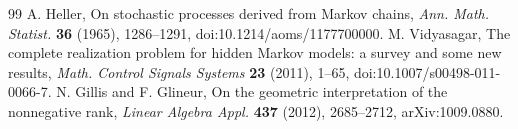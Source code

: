 \documentclass[11pt]{amsart}
\theoremstyle{definition}\newtheorem{definition}[theorem]{Definition}
\theoremstyle{remark}\newtheorem{remark}[theorem]{Remark}
\newcommand{\1}{\mathbf 1}
\begin{document}
\begin{thebibliography}{99}
 A. Heller, On stochastic processes derived from Markov chains,
\emph{Ann. Math. Statist.} \textbf{36} (1965), 1286--1291,
doi:10.1214/aoms/1177700000.
 M. Vidyasagar, The complete realization problem for
hidden Markov models: a survey and some new results,
\emph{Math. Control Signals Systems} \textbf{23} (2011), 1--65,
doi:10.1007/s00498-011-0066-7.
 N. Gillis and F. Glineur, On the geometric interpretation of
the nonnegative rank, \emph{Linear Algebra Appl.} \textbf{437} (2012),
2685--2712, arXiv:1009.0880.

\end{thebibliography}
\end{document}
